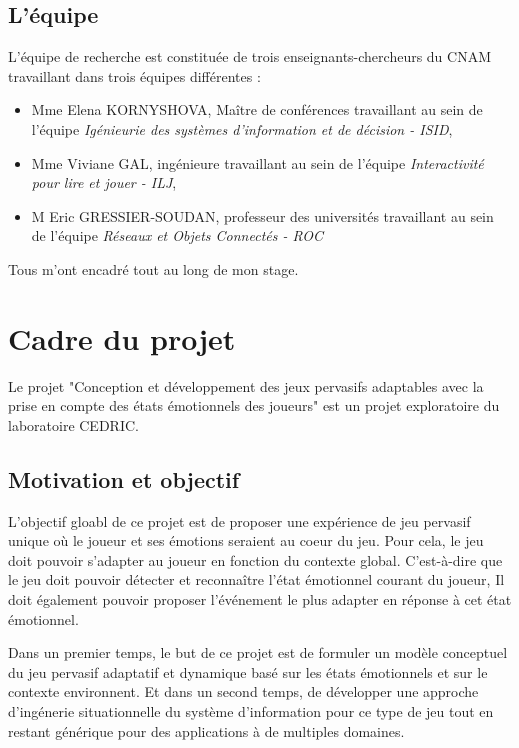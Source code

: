 \documentclass{article}
\begin{document}
	\subsection{L'équipe}
		L'équipe de recherche est constituée de trois enseignants-chercheurs du CNAM travaillant dans trois équipes différentes :
		\begin{itemize}
			\item Mme Elena KORNYSHOVA, Maître de conférences travaillant au sein de l'équipe \textit{Igénieurie des systèmes d'information et de décision - ISID}, 
			\item Mme Viviane GAL, ingénieure travaillant au sein de l'équipe \textit{Interactivité pour lire et jouer - ILJ},
			\item M Eric GRESSIER-SOUDAN, professeur des universités travaillant au sein de l'équipe \textit{Réseaux et Objets Connectés - ROC}
		\end{itemize}
		Tous m'ont encadré tout au long de mon stage.

\section{Cadre du projet}
	Le projet "Conception et développement des jeux pervasifs adaptables avec la prise en compte des états émotionnels des joueurs" est un projet exploratoire du laboratoire CEDRIC.
	\subsection{Motivation et objectif}
		L'objectif gloabl de ce projet est de proposer une expérience de jeu pervasif unique où le joueur et ses émotions seraient au coeur du jeu. 
		Pour cela, le jeu doit pouvoir s'adapter au joueur en fonction du contexte global. 
		C'est-à-dire que le jeu doit pouvoir détecter et reconnaître l'état émotionnel courant du joueur,
		Il doit également pouvoir proposer l'événement le plus adapter en réponse à cet état émotionnel.\par
		Dans un premier temps, le but de ce projet est de formuler un modèle conceptuel du jeu pervasif adaptatif et dynamique basé sur les états émotionnels et sur le contexte environnent. 
		Et dans un second temps, de développer une approche d'ingénerie situationnelle du système d'information pour ce type de jeu tout en restant générique pour des applications à de multiples domaines.\newline
\end{document}
